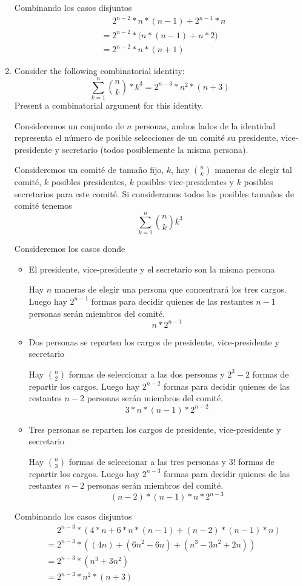 \begin{enumerate}
    Combinando los casos disjuntos
    \begin{align*}
        &\phantom{{}={}} 2^{n-2} * n * (n-1) + 2^{n-1} * n\\
        &= 2^{n-2} * \big( n * (n-1) + n * 2 \big)\\
        &= 2^{n-2} * n * (n+1)
    \end{align*}

    \item Consider the following combinatorial identity:
    \[ \sum_{k=1}^n \binom{n}{k} * k^3 = 2^{n-3} * n^2 * (n+3) \]
    Present a combinatorial argument for this identity.

    Consideremos un conjunto de $n$ personas, ambos lados de la identidad representa el número de posible selecciones de un comité su presidente, vice-presidente y secretario (todos posiblemente la misma persona).
    
    Consideremos un comité de tamaño fijo, $k$, hay $\displaystyle \binom{n}{k}$ maneras de elegir tal comité, $k$ posibles presidentes, $k$ posibles vice-presidentes y $k$ posibles secretarios para este comité. Si consideramos todos los posibles tamaños de comité tenemos
    \[ \sum_{k=1}^n \binom{n}{k} k^3 \]

    Consideremos los casos donde
    \begin{itemize}
        \item[] El presidente, vice-presidente y el secretario son la misma persona
        
        Hay $n$ maneras de elegir una persona que concentrará los tres cargos. Luego hay $2^{n-1}$ formas para decidir quienes de las restantes $n-1$ personas serán miembros del comité.
        \[ n * 2^{n-1} \]
        
        \item[] Dos personas se reparten los cargos de presidente, vice-presidente y secretario
        
        Hay $\displaystyle \binom{n}{2}$ formas de seleccionar a las dos personas y $2^3 - 2$ formas de repartir los cargos. Luego hay $2^{n-2}$ formas para decidir quienes de las restantes $n-2$ personas serán miembros del comité.
        \[ 3 * n * (n-1) * 2^{n-2} \]
        
        \item[] Tres personas se reparten los cargos de presidente, vice-presidente y secretario

        Hay $\displaystyle \binom{n}{3}$ formas de seleccionar a las tres personas y $3!$ formas de repartir los cargos. Luego hay $2^{n-3}$ formas para decidir quienes de las restantes $n-2$ personas serán miembros del comité.
        \[ (n-2) * (n-1) * n * 2^{n-3} \]
    \end{itemize}
    Combinando los casos disjuntos
    \begin{align*}
       &\phantom{{}={}} 2^{n-3} * (4 * n + 6 * n * (n-1) + (n-2) * (n-1) * n)\\
       &= 2^{n-3} * ((4n) + (6n^2 - 6n) + (n^3 - 3n^2 + 2n))\\
       &= 2^{n-3} * (n^3 + 3n^2)\\
       &= 2^{n-3} * n^2 * (n + 3)
    \end{align*}
\end{enumerate}